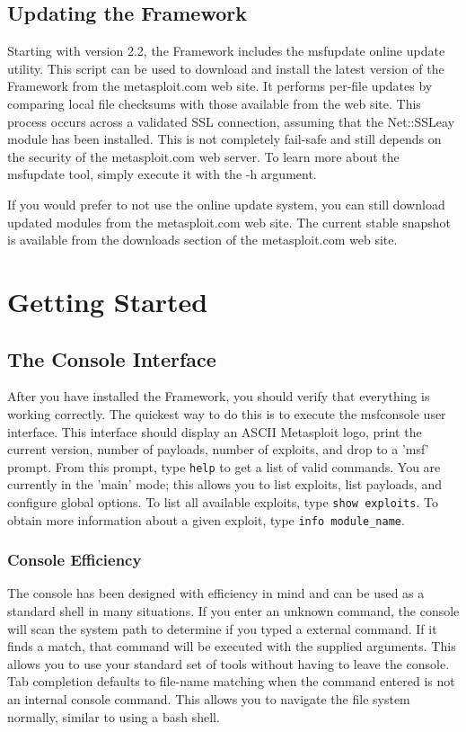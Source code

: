 \documentclass{report}
\begin{document}
    \section{Updating the Framework}
    \label{INSTALL-UPDATE}
\par
Starting with version 2.2, the Framework includes the msfupdate online update
utility. This script can be used to download and install the latest version of
the Framework from the metasploit.com web site. It performs per-file updates by
comparing local file checksums with those available from the web site. This
process occurs across a validated SSL connection, assuming that the Net::SSLeay
module has been installed. This is not completely fail-safe and still depends on
the security of the metasploit.com web server. To learn more about the msfupdate
tool, simply execute it with the -h argument. 

\par
If you would prefer to not use the online update system, you can still download
updated modules from the metasploit.com web site. The current stable snapshot is
available from the downloads section of the metasploit.com web site. 
\pagebreak

\chapter{Getting Started}

    \section{The Console Interface}
    \label{STARTED-CONSOLE}
\par
After you have installed the Framework, you should verify that everything is
working correctly.  The quickest way to do this is to execute the
msfconsole user interface. This interface should display an ASCII Metasploit logo, print
the current version, number of payloads, number of exploits, and drop to a 'msf'
prompt. From this prompt, type \texttt{help} to get a list of valid commands. You are
currently in the 'main' mode; this allows you to list exploits, list payloads,
and configure global options.  To list all available exploits, type \texttt{show
exploits}. To obtain more information about a given exploit, type \texttt{info
module\_name}. 


    \subsection{Console Efficiency}
    \label{CONSOLE-EFF}
\par
The console has been designed with efficiency in mind and can be used as a
standard shell in many situations. If you enter an unknown command, the console
will scan the system path to determine if you typed a external command. If it
finds a match, that command will be executed with the supplied arguments. This
allows you to use your standard set of tools without having to leave the
console. Tab completion defaults to file-name matching when the command entered
is not an internal console command. This allows you to navigate the file system
normally, similar to using a bash shell.  
\end{document}
